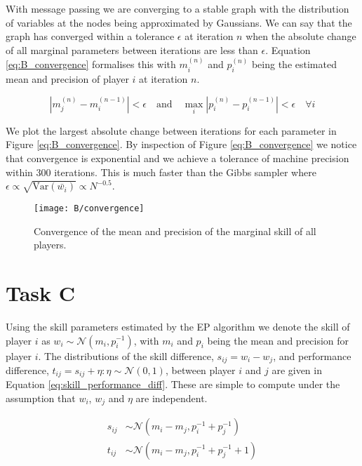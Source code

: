 \documentclass[11pt]{article}
\begin{document}
With message passing we are converging to a stable graph with the distribution of variables at the nodes being approximated by Gaussians. We can say that the graph has converged within a tolerance $\epsilon$ at iteration $n$ when the absolute change of all marginal parameters between iterations are less than $\epsilon$. Equation \ref{eq:B_convergence} formalises this with $m_i^{(n)}$ and $p_i^{(n)}$ being the estimated mean and precision of player $i$ at iteration $n$.

\begin{equation}
    |m_j^{(n)} - m_i^{(n-1)}| < \epsilon \quad \text{and} \quad \max_{i} |p_i^{(n)} - p_i^{(n-1)}| < \epsilon \quad \forall i
    \label{eq:B_convergence}
\end{equation}

We plot the largest absolute change between iterations for each parameter in Figure \ref{eq:B_convergence}. By inspection of Figure \ref{eq:B_convergence} we notice that convergence is exponential and we achieve a tolerance of machine precision within 300 iterations. This is much faster than the Gibbs sampler where $\epsilon \propto \sqrt{\text{Var}(\bar{w_i})} \propto N^{-0.5}$.

\begin{figure}[h]
    \centering
    \texttt{[image: B/convergence]} 
    \caption{Convergence of the mean and precision of the marginal skill of all players.}
    \label{fig:B_convergence}
\end{figure}

\section{Task C}

Using the skill parameters estimated by the EP algorithm we denote the skill of player $i$ as $w_i \sim \mathcal{N}(m_i, p_i^{-1})$, with $m_i$ and $p_i$ being the mean and precision for player $i$. The distributions of the skill difference, $s_{ij} = w_i - w_j$, and performance difference, $t_{ij} = s_{ij} + \eta : \eta \sim \mathcal{N}(0, 1)$, between player $i$ and $j$ are given in Equation \ref{eq:skill_performance_diff}. These are simple to compute under the assumption that $w_i$, $w_j$ and $\eta$ are independent.

\begin{equation}
\begin{split}
    s_{ij} &\sim \mathcal{N}(m_i - m_j, p_i^{-1} + p_j^{-1}) \\
    t_{ij} &\sim \mathcal{N}(m_i - m_j, p_i^{-1} + p_j^{-1} + 1)
\end{split}
\label{eq:skill_performance_diff}
\end{equation}
\end{document}
